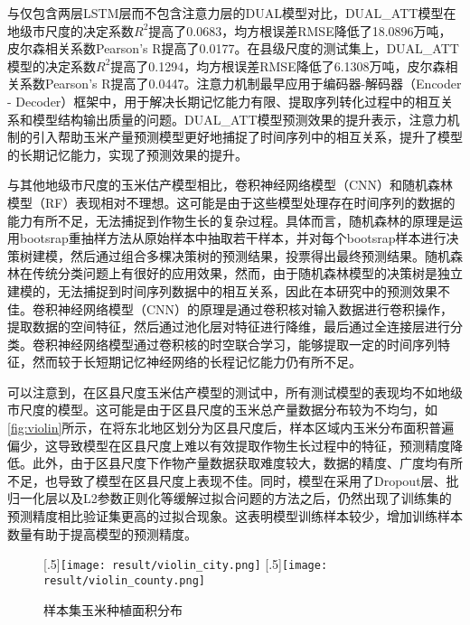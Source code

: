 \par 与仅包含两层LSTM层而不包含注意力层的DUAL模型对比，DUAL\_ATT模型在地级市尺度的决定系数$R^2$提高了0.0683，均方根误差RMSE降低了18.0896万吨，皮尔森相关系数Pearson's R提高了0.0177。在县级尺度的测试集上，DUAL\_ATT模型的决定系数$R^2$提高了0.1294，均方根误差RMSE降低了6.1308万吨，皮尔森相关系数Pearson's R提高了0.0447。注意力机制最早应用于编码器-解码器（Encoder - Decoder）框架中，用于解决长期记忆能力有限、提取序列转化过程中的相互关系和模型结构输出质量的问题\cite{朱张莉2019注意力机制在深度学习中的研究进展}。DUAL\_ATT模型预测效果的提升表示，注意力机制的引入帮助玉米产量预测模型更好地捕捉了时间序列中的相互关系，提升了模型的长期记忆能力，实现了预测效果的提升。

\par 与其他地级市尺度的玉米估产模型相比，卷积神经网络模型（CNN）和随机森林模型（RF）表现相对不理想。这可能是由于这些模型处理存在时间序列的数据的能力有所不足，无法捕捉到作物生长的复杂过程。具体而言，随机森林的原理是运用bootsrap重抽样方法从原始样本中抽取若干样本，并对每个bootsrap样本进行决策树建模，然后通过组合多棵决策树的预测结果，投票得出最终预测结果\cite{方匡南2011随机森林方法研究综述}。随机森林在传统分类问题上有很好的应用效果，然而，由于随机森林模型的决策树是独立建模的，无法捕捉到时间序列数据中的相互关系，因此在本研究中的预测效果不佳。卷积神经网络模型（CNN）的原理是通过卷积核对输入数据进行卷积操作，提取数据的空间特征，然后通过池化层对特征进行降维，最后通过全连接层进行分类\cite{周飞燕2017卷积神经网络研究综述}。卷积神经网络模型通过卷积核的时空联合学习，能够提取一定的时间序列特征，然而较于长短期记忆神经网络的长程记忆能力仍有所不足。

\par 可以注意到，在区县尺度玉米估产模型的测试中，所有测试模型的表现均不如地级市尺度的模型。这可能是由于区县尺度的玉米总产量数据分布较为不均匀，如\autoref{fig:violin}所示，在将东北地区划分为区县尺度后，样本区域内玉米分布面积普遍偏少，这导致模型在区县尺度上难以有效提取作物生长过程中的特征，预测精度降低。此外，由于区县尺度下作物产量数据获取难度较大，数据的精度、广度均有所不足，也导致了模型在区县尺度上表现不佳。同时，模型在采用了Dropout层、批归一化层以及L2参数正则化等缓解过拟合问题的方法之后，仍然出现了训练集的预测精度相比验证集更高的过拟合现象。这表明模型训练样本较少，增加训练样本数量有助于提高模型的预测精度。

\begin{figure}
  \centering
  [.5\linewidth]{\texttt{[image: result/violin\_city.png]}}\hfill
  [.5\linewidth]{\texttt{[image: result/violin\_county.png]}}\hfill
  \caption{样本集玉米种植面积分布}
  \label{fig:violin}
\end{figure}


